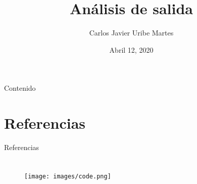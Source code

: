 \documentclass[xcolor=table, aspectratio=43]{beamer}
\title{Análisis de salida} %
\author[C.J. Uribe-Martes]{Carlos Javier Uribe Martes}
\institute[CUC]{
    Ingeniería Industrial%
    \\%
    Universidad de la Costa%
} %
\date{Abril 12, 2020}
\begin{document}
    
    \frame{\titlepage}
    
    \begin{frame}{Contenido}
        \tableofcontents
    \end{frame}
    
    
    
    
    
    
    
    
    
    
    

    \section*{Referencias} %
        \begin{frame}{Referencias}
            \printbibliography
        \end{frame}
     
    \section{}   
        \begin{frame}{}
            \begin{figure}
                \centering
                \texttt{[image: images/code.png]}
            \end{figure}
        \end{frame}
      
\end{document}
